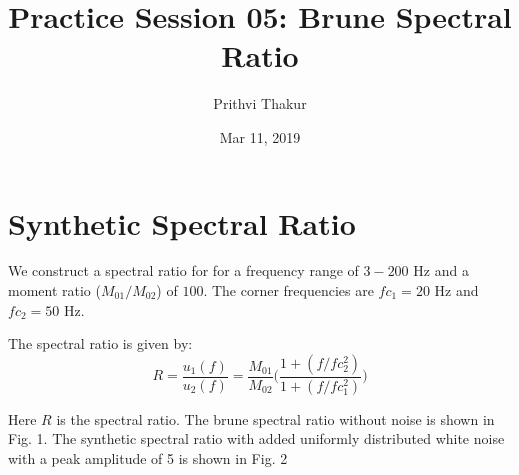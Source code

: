 \documentclass[11pt]{article}
\title{Practice Session 05: Brune Spectral Ratio}
\author{Prithvi Thakur}
\date{Mar 11, 2019}
\begin{document}
\maketitle

\section*{Synthetic Spectral Ratio}
We construct a spectral ratio for for a frequency range of $3 - 200$ Hz and a moment ratio ($M_{01}/M_{02}$) of $100$. The corner frequencies are $fc_1 = 20$ Hz and $fc_2 = 50$ Hz.

The spectral ratio is given by:
\begin{equation}
    R = \frac{u_1(f)}{u_2(f)} = \frac{M_{01}}{M_{02}}\big(\frac{1 + (f/fc_2^2)}{1 + (f/fc_1^2)}\big)
\end{equation}

Here $R$ is the spectral ratio. The brune spectral ratio without noise is shown in Fig. 1. The synthetic spectral ratio with added uniformly distributed white noise with a peak amplitude of 5 is shown in Fig. 2
\end{document}
